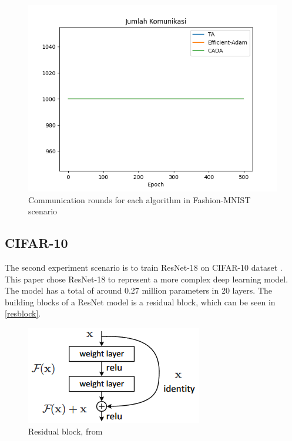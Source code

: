 \begin{figure}[htbp]
  \centering
  \includegraphics[width=0.8\columnwidth]{resources/fashion_comms.png}
  \caption{\label{fashioncomms1}Communication rounds for each algorithm in Fashion-MNIST scenario}
\end{figure}

\subsection{CIFAR-10}
The second experiment scenario is to train ResNet-18 \cite{he2015deep} on CIFAR-10 dataset \cite{krizhevsky2009cifar}. This paper chose ResNet-18 to represent a more complex deep learning model. The model has a total of around 0.27 million parameters in 20 layers. The building blocks of a ResNet model is a residual block, which can be seen in \autoref{resblock}.
\begin{figure}[htbp]
  \centering
  \includegraphics[width=0.8\columnwidth]{resources/resblock.png}
  \caption{\label{resblock}Residual block, from \cite{he2015deep}}
\end{figure}

